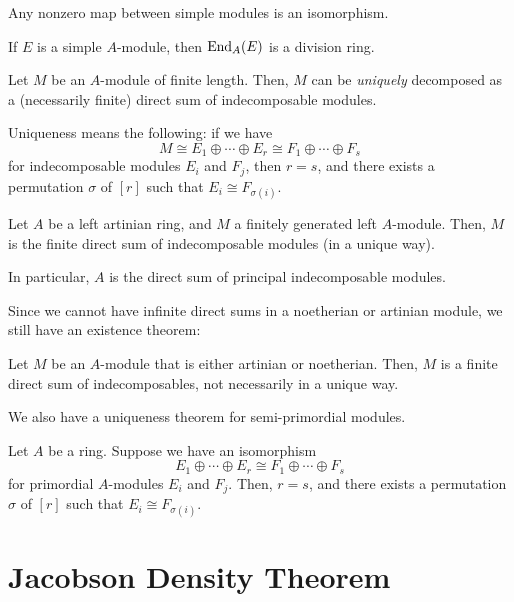 \documentclass[12pt]{article}
\begin{document}
\begin{thm}[Schur]
	Any nonzero map between simple modules is an isomorphism.

	If $E$ is a simple $A$-module, then $\operatorname{End}_{A}(E)$ is a division ring.
\end{thm}

\begin{thm} \label{thm:krs}
	Let $M$ be an $A$-module of finite length. 
	Then, $M$ can be \emph{uniquely} decomposed as a (necessarily finite) direct sum of indecomposable modules.

	Uniqueness means the following: if we have
	\begin{equation*} 
		M \cong E_{1} \oplus \cdots \oplus E_{r} \cong F_{1} \oplus \cdots \oplus F_{s}
	\end{equation*}
	for indecomposable modules $E_{i}$ and $F_{j}$, 
	then $r = s$, 
	and there exists a permutation $\sigma$ of $[r]$ such that 
	$E_{i} \cong F_{\sigma(i)}$.
\end{thm}
\begin{cor}
	Let $A$ be a left artinian ring, and $M$ a finitely generated left $A$-module. 
	Then, $M$ is the finite direct sum of indecomposable modules (in a unique way). 

	In particular, $A$ is the direct sum of principal indecomposable modules.
\end{cor}

Since we cannot have infinite direct sums in a noetherian or artinian module, we still have an existence theorem:
\begin{thm}
	Let $M$ be an $A$-module that is either artinian or noetherian. 
	Then, $M$ is a finite direct sum of indecomposables, not necessarily in a unique way.
\end{thm}

We also have a uniqueness theorem for semi-primordial modules.

\begin{thm}
	Let $A$ be a ring. Suppose we have an isomorphism
	\begin{equation*} 
		E_{1} \oplus \cdots \oplus E_{r} \cong F_{1} \oplus \cdots \oplus F_{s}
	\end{equation*}
	for primordial $A$-modules $E_{i}$ and $F_{j}$. 
	Then, $r = s$, 
	and there exists a permutation $\sigma$ of $[r]$ such that 
	$E_{i} \cong F_{\sigma(i)}$.
\end{thm}

\section{Jacobson Density Theorem}
\end{document}
